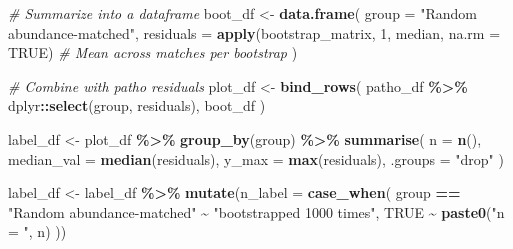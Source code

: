 \documentclass[
]{article}
\newenvironment{Shaded}{\begin{snugshade}}{\end{snugshade}}
\newcommand{\AttributeTok}[1]{\textcolor[rgb]{0.13,0.29,0.53}{#1}}
\newcommand{\CommentTok}[1]{\textcolor[rgb]{0.56,0.35,0.01}{\textit{#1}}}
\newcommand{\ConstantTok}[1]{\textcolor[rgb]{0.56,0.35,0.01}{#1}}
\newcommand{\DecValTok}[1]{\textcolor[rgb]{0.00,0.00,0.81}{#1}}
\newcommand{\FunctionTok}[1]{\textcolor[rgb]{0.13,0.29,0.53}{\textbf{#1}}}
\newcommand{\NormalTok}[1]{#1}
\newcommand{\OtherTok}[1]{\textcolor[rgb]{0.56,0.35,0.01}{#1}}
\newcommand{\SpecialCharTok}[1]{\textcolor[rgb]{0.81,0.36,0.00}{\textbf{#1}}}
\newcommand{\StringTok}[1]{\textcolor[rgb]{0.31,0.60,0.02}{#1}}
\begin{document}
\begin{Shaded}
\begin{Highlighting}[]
\CommentTok{\# Summarize into a dataframe}
\NormalTok{boot\_df }\OtherTok{\textless{}{-}} \FunctionTok{data.frame}\NormalTok{(}
  \AttributeTok{group =} \StringTok{"Random abundance{-}matched"}\NormalTok{,}
  \AttributeTok{residuals =} \FunctionTok{apply}\NormalTok{(bootstrap\_matrix, }\DecValTok{1}\NormalTok{, median, }\AttributeTok{na.rm =} \ConstantTok{TRUE}\NormalTok{)   }\CommentTok{\# Mean across matches per bootstrap}
\NormalTok{)}

\CommentTok{\# Combine with patho residuals}
\NormalTok{plot\_df }\OtherTok{\textless{}{-}} \FunctionTok{bind\_rows}\NormalTok{(}
\NormalTok{  patho\_df }\SpecialCharTok{\%\textgreater{}\%}\NormalTok{ dplyr}\SpecialCharTok{::}\FunctionTok{select}\NormalTok{(group, residuals),}
\NormalTok{  boot\_df}
\NormalTok{)}

\NormalTok{label\_df }\OtherTok{\textless{}{-}}\NormalTok{ plot\_df }\SpecialCharTok{\%\textgreater{}\%}
  \FunctionTok{group\_by}\NormalTok{(group) }\SpecialCharTok{\%\textgreater{}\%}
  \FunctionTok{summarise}\NormalTok{(}
    \AttributeTok{n =} \FunctionTok{n}\NormalTok{(),}
    \AttributeTok{median\_val =} \FunctionTok{median}\NormalTok{(residuals),}
    \AttributeTok{y\_max =} \FunctionTok{max}\NormalTok{(residuals),}
    \AttributeTok{.groups =} \StringTok{"drop"}
\NormalTok{  )}

\NormalTok{label\_df }\OtherTok{\textless{}{-}}\NormalTok{ label\_df }\SpecialCharTok{\%\textgreater{}\%}
  \FunctionTok{mutate}\NormalTok{(}\AttributeTok{n\_label =} \FunctionTok{case\_when}\NormalTok{(}
\NormalTok{    group }\SpecialCharTok{==} \StringTok{"Random abundance{-}matched"} \SpecialCharTok{\textasciitilde{}} \StringTok{"bootstrapped 1000 times"}\NormalTok{,}
    \ConstantTok{TRUE} \SpecialCharTok{\textasciitilde{}} \FunctionTok{paste0}\NormalTok{(}\StringTok{"n = "}\NormalTok{, n)}
\NormalTok{  ))}


\end{Highlighting}
\end{Shaded}
\end{document}
